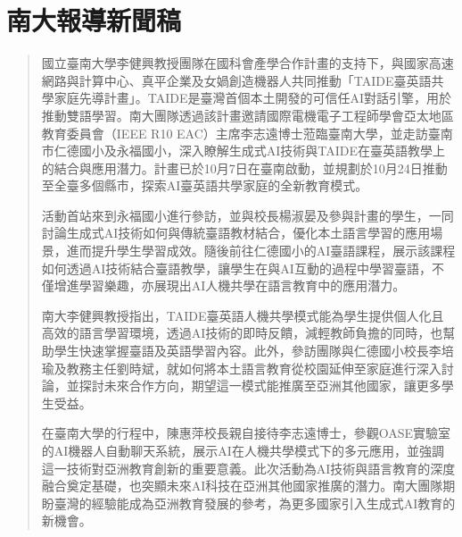 \chapter{南大報導新聞稿} \label{appedix:NUTNnews1}
\begin{quote}
國立臺南大學李健興教授團隊在國科會產學合作計畫的支持下，與國家高速網路與計算中心、真平企業及女媧創造機器人共同推動「TAIDE臺英語共學家庭先導計畫」。TAIDE是臺灣首個本土開發的可信任AI對話引擎，用於推動雙語學習。南大團隊透過該計畫邀請國際電機電子工程師學會亞太地區教育委員會（IEEE R10 EAC）主席李志遠博士蒞臨臺南大學，並走訪臺南市仁德國小及永福國小，深入瞭解生成式AI技術與TAIDE在臺英語教學上的結合與應用潛力。計畫已於10月7日在臺南啟動，並規劃於10月24日推動至全臺多個縣市，探索AI臺英語共學家庭的全新教育模式。

活動首站來到永福國小進行參訪，並與校長楊淑晏及參與計畫的學生，一同討論生成式AI技術如何與傳統臺語教材結合，優化本土語言學習的應用場景，進而提升學生學習成效。隨後前往仁德國小的AI臺語課程，展示該課程如何透過AI技術結合臺語教學，讓學生在與AI互動的過程中學習臺語，不僅增進學習樂趣，亦展現出AI人機共學在語言教育中的應用潛力。

南大李健興教授指出，TAIDE臺英語人機共學模式能為學生提供個人化且高效的語言學習環境，透過AI技術的即時反饋，減輕教師負擔的同時，也幫助學生快速掌握臺語及英語學習內容。此外，參訪團隊與仁德國小校長李培瑜及教務主任劉時斌，就如何將本土語言教育從校園延伸至家庭進行深入討論，並探討未來合作方向，期望這一模式能推廣至亞洲其他國家，讓更多學生受益。

在臺南大學的行程中，陳惠萍校長親自接待李志遠博士，參觀OASE實驗室的AI機器人自動聊天系統，展示AI在人機共學模式下的多元應用，並強調這一技術對亞洲教育創新的重要意義。此次活動為AI技術與語言教育的深度融合奠定基礎，也突顯未來AI科技在亞洲其他國家推廣的潛力。南大團隊期盼臺灣的經驗能成為亞洲教育發展的參考，為更多國家引入生成式AI教育的新機會。
\end{quote}



